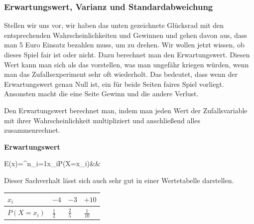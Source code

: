 \documentclass[12pt]{article}
\begin{document}
			\subsubsection{Erwartungswert, Varianz und Standardabweichung}
				Stellen wir uns vor, wir haben das unten gezeichnete Glücksrad mit den entsprechenden Wahrscheinlichkeiten und Gewinnen und gehen davon aus, dass man 5 Euro Einsatz bezahlen muss, um zu drehen. Wir wollen jetzt wissen, ob dieses Spiel fair ist oder nicht. Dazu berechnet man den Erwartungswert. Diesen Wert kann man sich als das vorstellen, was man ungefähr kriegen würden, wenn man das Zufallsexperiment sehr oft wiederholt. Das bedeutet, dass wenn der Erwartungswert genau Null ist, ein für beide Seiten faires Spiel vorliegt. Ansonsten macht die eine Seite Gewinn und die andere Verlust.
				\begin{center}
				\end{center}
				Den Erwartungswert berechnet man, indem man jeden Wert der Zufallsvariable mit ihrer Wahrscheinlichkeit multipliziert und anschließend alles zusammenrechnet.
				\begin{tcolorbox}[boxsep=0pt,top=.75cm,left=.75cm,right=.75cm, bottom=.75cm,arc=0pt,auto outer arc,colback=white,colframe=gray, enlarge top by=.5cm, enlarge bottom by=.5cm]
					\textbf{Erwartungswert}
					\begin{flalign*}
						E(x)=\sum^n_{i=1}x_i\cdot P(X=x_i)&&
					\end{flalign*}
				\end{tcolorbox}
				\noindent Dieser Sachverhalt lässt sich auch sehr gut in einer Wertetabelle darstellen.
				\begin{center}
					\bgroup
					\def\arraystretch{1.5}
					\begin{tabularx}{\linewidth}{|l|@{\hspace{0.5cm}}|X|X|X|}
						\hline
						$x_i$ & $-4$ & $-3$ & $+10$ \\ \hline
						$P(X=x_i)$ & $\frac{1}{2}$ & $\frac{2}{5}$ & $\frac{1}{10}$ \\ \hline
					\end{tabularx}
					\egroup
				\end{center}
\end{document}
